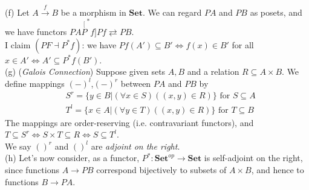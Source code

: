 \documentclass[a4paper]{article}
\begin{document}
\begin{eg}
    (f) Let $A \xrightarrow{f} B$ be a morphism in $\mathbf{Set}$. We can regard $PA$ and $PB$ as posets, and we have functors $PA \stackrel[P^*f]{Pf}{\rightleftarrows} PB$.\\
    I claim $(PF \dashv P^*f)$: we have $Pf(A') \subseteq B' \iff f(x) \in B'$ for all $x \in A' \iff A' \subseteq P^* f(B')$.\\
    (g) (\emph{Galois Connection}) Suppose given sets $A,B$ and a relation $R \subseteq A \times B$. We define mappings $(-)^l$,$(-)^r$ between $PA$ and $PB$ by 
    \begin{equation*}
        \begin{aligned}
            &S^r = \{y \in B| (\forall x \in S) ((x,y) \in R) \} \text{ for } S \subseteq A\\
            &T^l = \{x \in A | (\forall y \in T) ((x,y) \in R)\} \text{ for } T \subseteq B
        \end{aligned}
    \end{equation*}
    The mappings are order-reserving (i.e. contravariant functors), and $T \subseteq S^r \iff S \times T \subseteq R \iff S \subseteq T^l$.\\
    We say $()^r$ and $()^l$ are \emph{adjoint on the right}.\\
    (h) Let's now consider, as a functor, $P^* : \mathbf{Set}^{op} \to \mathbf{Set}$ is self-adjoint on the right, since functions $A \to PB$ correspond bijectively to subsets of $A \times B$, and hence to functions $B \to PA$.
\end{eg}
\end{document}
